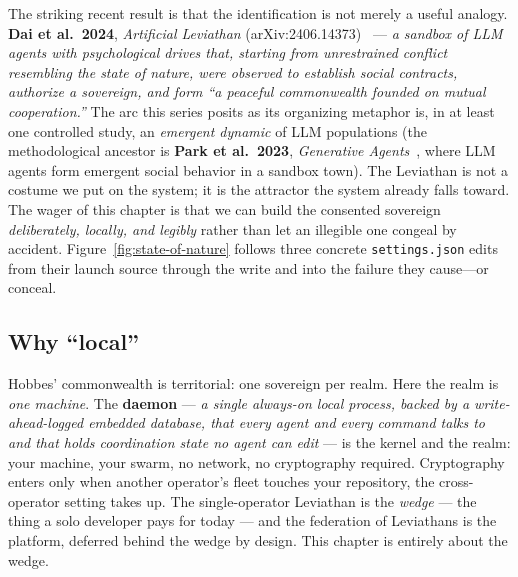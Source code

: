 \documentclass[11pt,a4paper]{article}
\theoremstyle{definition}
\theoremstyle{plain}
\begin{document}
The striking recent result is that the identification is not merely a useful
analogy. \textbf{Dai et al.\ 2024}, \emph{Artificial Leviathan}
(arXiv:2406.14373)~ --- \emph{a sandbox of LLM agents with
psychological drives that, starting from unrestrained conflict resembling the state
of nature, were observed to establish social contracts, authorize a sovereign, and
form ``a peaceful commonwealth founded on mutual cooperation.''} The arc this
series posits as its organizing metaphor is, in at least one controlled study, an
\emph{emergent dynamic} of LLM populations (the methodological ancestor is
\textbf{Park et al.\ 2023}, \emph{Generative Agents}~, where LLM
agents form emergent social behavior in a sandbox town). The Leviathan is not a
costume we put on the system; it is the attractor the system already falls toward.
The wager of this chapter is that we can build the consented sovereign
\emph{deliberately, locally, and legibly} rather than let an illegible one congeal
by accident. Figure~\ref{fig:state-of-nature} follows three concrete
\texttt{settings.json} edits from their launch source through the write and into
the failure they cause---or conceal.

\subsection{Why ``local''}\label{sec:local}
Hobbes' commonwealth is territorial: one sovereign per realm. Here the realm is
\emph{one machine}. The \textbf{daemon} --- \emph{a single always-on local process,
backed by a write-ahead-logged embedded database, that every agent and every
command talks to and that holds coordination state no agent can edit} --- is the
kernel and the realm: your machine, your swarm, no network, no cryptography
required. Cryptography enters only when another operator's fleet touches your
repository, the cross-operator setting  takes up. The single-operator Leviathan is the \emph{wedge} --- the thing
a solo developer pays for today --- and the federation of Leviathans is the
platform, deferred behind the wedge by design. This chapter is entirely about the
wedge.
\end{document}
